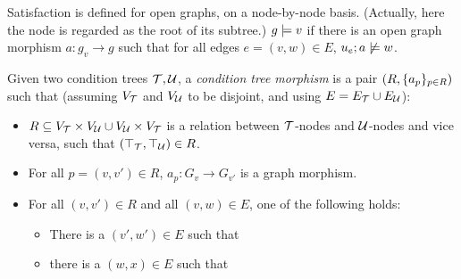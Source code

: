 \medskip\noindent Satisfaction is defined for open graphs, on a node-by-node basis. (Actually, here the node is regarded as the root of its subtree.) $g\models v$ if there is an open graph morphism $a:g_v\to g$ such that for all edges $e=(v,w)\in E$, $u_e;a\not\models w$.

\medskip\noindent
%
Given two condition trees ${\mathcal{T}},{\mathcal{U}}$, a \emph{condition tree morphism} is a pair $(R,\{{a_p}\}_{p\in R})$ such that (assuming $V_{\mathcal{T}}$ and $V_{\mathcal{U}}$ to be disjoint, and using $E=E_{\mathcal{T}}\cup E_{\mathcal{U}}$):

\begin{itemize}
\item $R\subseteq V_{\mathcal{T}}\times V_{\mathcal{U}}\cup V_{\mathcal{U}}\times V_{\mathcal{T}}$ is a relation between ${\mathcal{T}}$-nodes and ${\mathcal{U}}$-nodes and vice versa, such that $(\top_{{\mathcal{T}}},\top_{{\mathcal{U}}})\in R$.

\item For all $p=(v,v')\in R$, $a_p:G_v\to G_{v'}$ is a graph morphism.

\item For all $(v,v')\in R$ and all $(v,w)\in E$, one of the following holds:
\begin{itemize}
\item There is a $(v',w')\in E$ such that
\item there is a $(w,x)\in E$ such that
\end{itemize}
\end{itemize}
